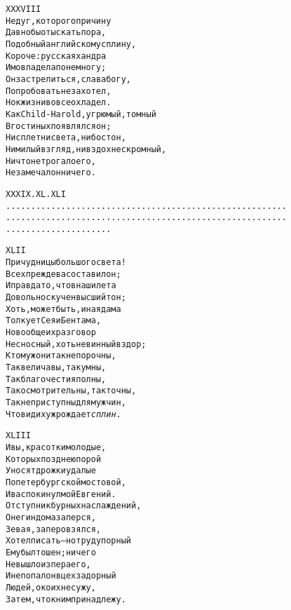 \begin{minipage}[t]{\dimexpr 0.5\textwidth -\tabcolsep-.5pt}
\begin{alltt}\normalfont\centering
XXXVIII
Недуг, которого причину
Давно бы отыскать пора,
Подобный английскому сплину,
Короче: русская хандра
Им овладела понемногу;
Он застрелиться, слава богу,
Попробовать не захотел,
Но к жизни вовсе охладел.
Как Child-Harold, угрюмый, томный
В гостиных появлялся он;
Ни сплетни света, ни бостон,
Ни милый взгляд, ни вздох нескромный,
Ничто не трогало его,
Не замечал он ничего.
\end{alltt}
\end{minipage}
\clearpage

\begin{minipage}[t]{\dimexpr 0.5\textwidth -\tabcolsep-.5pt}
\begin{alltt}\normalfont\centering
XXXIX. XL. XLI
........................................................
........................................................
.....................
\end{alltt}
\end{minipage}

\vspace{4in}
\begin{minipage}[t]{\dimexpr 0.5\textwidth -\tabcolsep-.5pt}
\begin{alltt}\normalfont\centering
XLII
Причудницы большого света!
Всех прежде вас оставил он;
И правда то, что в наши лета
Довольно скучен высший тон;
Хоть, может быть, иная дама
Толкует Сея и Бентама,
Но вообще их разговор
Несносный, хоть невинный вздор;
К тому ж они так непорочны,
Так величавы, так умны,
Так благочестия полны,
Так осмотрительны, так точны,
Так неприступны для мужчин,
Что вид их уж рождает \textit{сплин}.
\end{alltt}
\end{minipage}
\clearpage

\begin{minipage}[t]{\dimexpr 0.5\textwidth -\tabcolsep-.5pt}
\begin{alltt}\normalfont\centering
XLIII
И вы, красотки молодые,
Которых позднею порой
Уносят дрожки удалые
По петербургской мостовой,
И вас покинул мой Евгений.
Отступник бурных наслаждений,
Онегин дома заперся,
Зевая, за перо взялся,
Хотел писать — но труд упорный
Ему был тошен; ничего
Не вышло из пера его,
И не попал он в цех задорный
Людей, о коих не сужу,
Затем, что к ним принадлежу.
\end{alltt}
\end{minipage}

